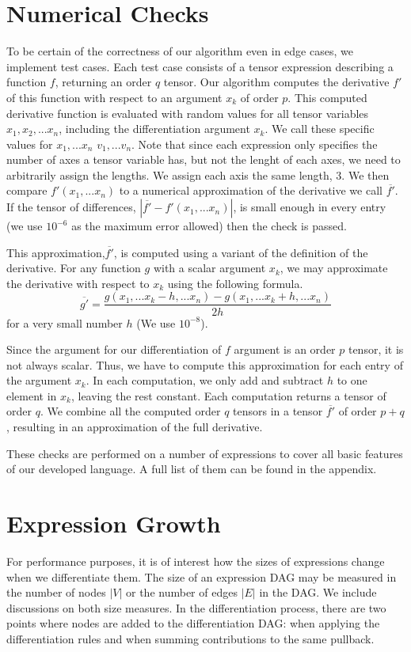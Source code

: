 \documentclass[12pt, a4paper]{report}
\begin{document}
\section{Numerical Checks}
To be certain of the correctness of our algorithm even in edge cases, we implement test cases.
Each test case consists of a tensor expression describing a function $f$, returning an order $q$ tensor. 
Our algorithm computes the derivative $f'$ of this function with respect to an argument $x_k$ of order $p$.
This computed derivative function is evaluated with random values for all tensor variables $x_1, x_2, ... x_n$, including the differentiation argument $x_k$.
We call these specific values for $x_1, ... x_n$ $v_1, ... v_n$.
Note that since each expression only specifies the number of axes a tensor variable has, but not the lenght of each axes, we need to arbitrarily assign the lengths.
We assign each axis the same length, $3$.
We then compare $f'(x_1,... x_n)$ to a numerical approximation of the derivative we call $\overline{f'}$.
If the tensor of differences, $|\overline{f'} - f'(x_1,... x_n)|$, is small enough in every entry (we use $10^{-6}$ as the maximum error allowed) then the check is passed.

This approximation,$\overline{f'}$, is computed using a variant of the definition of the derivative.
For any function $g$ with a scalar argument $x_k$, we may approximate the derivative with respect to $x_k$ using the following formula.
$$\overline{g'} = \frac{g(x_1,... x_k-h,... x_n) - g(x_1,... x_k+h,... x_n)}{2h}$$ 
for a very small number $h$ (We use $10^{-8}$).

Since the argument for our differentiation of $f$ argument is an order $p$ tensor, it is not always scalar.
Thus, we have to compute this approximation for each entry of the argument $x_k$.
In each computation, we only add and subtract $h$ to one element in $x_k$, leaving the rest constant.
Each computation returns a tensor of order $q$.
We combine all the computed order $q$ tensors in a tensor $\overline{f'}$ of order $p+q$, resulting in an approximation of the full derivative.

These checks are performed on a number of expressions to cover all basic features of our developed language.
A full list of them can be found in the appendix.

\section{Expression Growth}
For performance purposes, it is of interest how the sizes of expressions change when we differentiate them.
The size of an expression DAG may be measured in the number of nodes $|V|$ or the number of edges $|E|$ in the DAG.
We include discussions on both size measures.
In the differentiation process, there are two points where nodes are added to the differentiation DAG: when applying the differentiation rules and when summing contributions to the same pullback.
\end{document}
